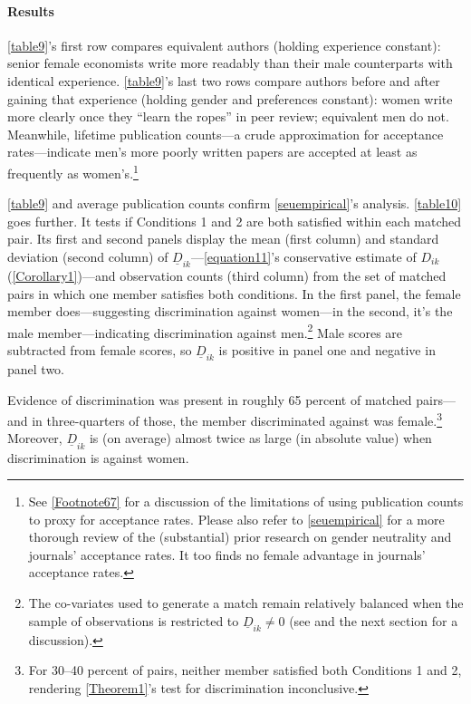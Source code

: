 \paragraph{Results}
\label{matchingresults}



\autoref{table9}'s first row compares equivalent authors (holding experience constant): senior female economists write more readably than their male counterparts with identical experience. \autoref{table9}'s last two rows compare authors before and after gaining that experience (holding gender and preferences constant): women write more clearly once they ``learn the ropes'' in peer review; equivalent men do not. Meanwhile, lifetime publication counts---a crude approximation for acceptance rates---indicate men's more poorly written papers are accepted at least as frequently as women's.\footnote{See \autoref{Footnote67} for a discussion of the limitations of using publication counts to proxy for acceptance rates. Please also refer to \autoref{seuempirical} for a more thorough review of the (substantial) prior research on gender neutrality and journals' acceptance rates. It too finds no female advantage in journals' acceptance rates.}

\autoref{table9} and average publication counts confirm \autoref{seuempirical}'s analysis. \autoref{table10} goes further. It tests if Conditions 1 and 2 are both satisfied within each matched pair. Its first and second panels display the mean (first column) and standard deviation (second column) of $\underline D_{ik}$---\autoref{equation11}'s conservative estimate of $D_{ik}$ (\autoref{Corollary1})---and observation counts (third column) from the set of matched pairs in which one member satisfies both conditions. In the first panel, the female member does---suggesting discrimination against women---in the second, it's the male member---indicating discrimination against men.\footnote{The co-variates used to generate a match remain relatively balanced when the sample of observations is restricted to $\underline D_{ik}\ne0$ (see  and the next section for a discussion).} Male scores are subtracted from female scores, so $\underline D_{ik}$ is positive in panel one and negative in panel two.



Evidence of discrimination was present in roughly 65 percent of matched pairs---and in three-quarters of those, the member discriminated against was female.\footnote{For 30--40 percent of pairs, neither member satisfied both Conditions 1 and 2, rendering \autoref{Theorem1}'s test for discrimination inconclusive.} Moreover, $\underline D_{ik}$ is (on average) almost twice as large (in absolute value) when discrimination is against women.

